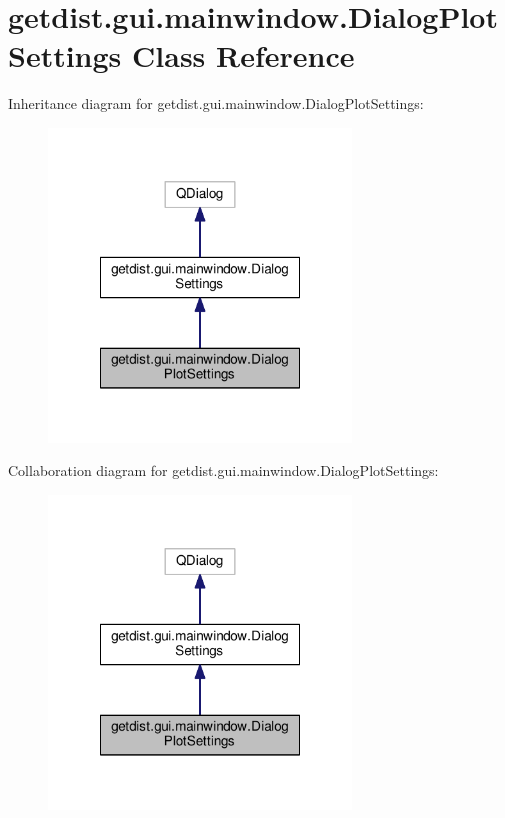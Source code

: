 \hypertarget{classgetdist_1_1gui_1_1mainwindow_1_1DialogPlotSettings}{}\section{getdist.\+gui.\+mainwindow.\+Dialog\+Plot\+Settings Class Reference}
\label{classgetdist_1_1gui_1_1mainwindow_1_1DialogPlotSettings}


Inheritance diagram for getdist.\+gui.\+mainwindow.\+Dialog\+Plot\+Settings\+:
\nopagebreak
\begin{figure}[H]
\begin{center}
\leavevmode
\includegraphics[width=228pt]{classgetdist_1_1gui_1_1mainwindow_1_1DialogPlotSettings__inherit__graph}
\end{center}
\end{figure}


Collaboration diagram for getdist.\+gui.\+mainwindow.\+Dialog\+Plot\+Settings\+:
\nopagebreak
\begin{figure}[H]
\begin{center}
\leavevmode
\includegraphics[width=228pt]{classgetdist_1_1gui_1_1mainwindow_1_1DialogPlotSettings__coll__graph}
\end{center}
\end{figure}
